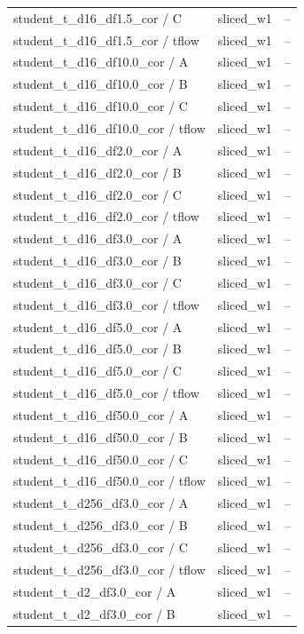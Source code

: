 \begin{tabular}{lll}
student\_t\_d16\_df1.5\_cor / C & sliced\_w1 & -- \\
student\_t\_d16\_df1.5\_cor / tflow & sliced\_w1 & -- \\
student\_t\_d16\_df10.0\_cor / A & sliced\_w1 & -- \\
student\_t\_d16\_df10.0\_cor / B & sliced\_w1 & -- \\
student\_t\_d16\_df10.0\_cor / C & sliced\_w1 & -- \\
student\_t\_d16\_df10.0\_cor / tflow & sliced\_w1 & -- \\
student\_t\_d16\_df2.0\_cor / A & sliced\_w1 & -- \\
student\_t\_d16\_df2.0\_cor / B & sliced\_w1 & -- \\
student\_t\_d16\_df2.0\_cor / C & sliced\_w1 & -- \\
student\_t\_d16\_df2.0\_cor / tflow & sliced\_w1 & -- \\
student\_t\_d16\_df3.0\_cor / A & sliced\_w1 & -- \\
student\_t\_d16\_df3.0\_cor / B & sliced\_w1 & -- \\
student\_t\_d16\_df3.0\_cor / C & sliced\_w1 & -- \\
student\_t\_d16\_df3.0\_cor / tflow & sliced\_w1 & -- \\
student\_t\_d16\_df5.0\_cor / A & sliced\_w1 & -- \\
student\_t\_d16\_df5.0\_cor / B & sliced\_w1 & -- \\
student\_t\_d16\_df5.0\_cor / C & sliced\_w1 & -- \\
student\_t\_d16\_df5.0\_cor / tflow & sliced\_w1 & -- \\
student\_t\_d16\_df50.0\_cor / A & sliced\_w1 & -- \\
student\_t\_d16\_df50.0\_cor / B & sliced\_w1 & -- \\
student\_t\_d16\_df50.0\_cor / C & sliced\_w1 & -- \\
student\_t\_d16\_df50.0\_cor / tflow & sliced\_w1 & -- \\
student\_t\_d256\_df3.0\_cor / A & sliced\_w1 & -- \\
student\_t\_d256\_df3.0\_cor / B & sliced\_w1 & -- \\
student\_t\_d256\_df3.0\_cor / C & sliced\_w1 & -- \\
student\_t\_d256\_df3.0\_cor / tflow & sliced\_w1 & -- \\
student\_t\_d2\_df3.0\_cor / A & sliced\_w1 & -- \\
student\_t\_d2\_df3.0\_cor / B & sliced\_w1 & -- \\

\end{tabular}
